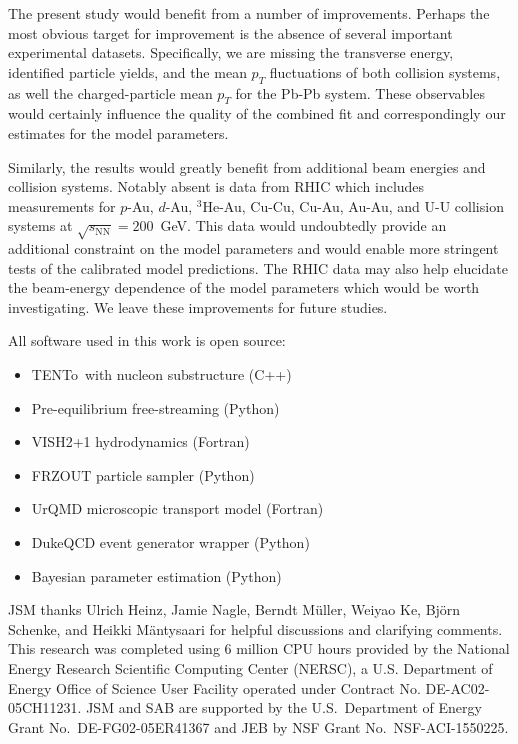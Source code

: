 \documentclass[aps,prc,reprint,amsmath,nofootinbib]{revtex4-1}
\newcommand{\trento}{T\raisebox{-0.5ex}{R}ENTo}
\newcommand{\sqrts}{\sqrt{s_\mathrm{NN}}}
\begin{document}
The present study would benefit from a number of improvements.
Perhaps the most obvious target for improvement is the absence of several important experimental datasets.
Specifically, we are missing the transverse energy, identified particle yields, and the mean $p_T$ fluctuations of both collision systems, as well the charged-particle mean $p_T$ for the Pb-Pb system.
These observables would certainly influence the quality of the combined fit and correspondingly our estimates for the model parameters.

Similarly, the results would greatly benefit from additional beam energies and collision systems.
Notably absent is data from RHIC which includes measurements for $p$-Au, $d$-Au, $^3$He-Au, Cu-Cu, Cu-Au, Au-Au, and \mbox{U-U} collision systems at $\sqrts=200$~GeV.
This data would undoubtedly provide an additional constraint on the model parameters and would enable more stringent tests of the calibrated model predictions.
The RHIC data may also help elucidate the beam-energy dependence of the model parameters which would be worth investigating.
We leave these improvements for future studies.

\medskip

All software used in this work is open source:
\begin{itemize}[leftmargin=2\parindent, itemsep=0pt, topsep=5pt]
  \item \trento\ with nucleon substructure (C++) \cite{trento:code}
  \item Pre-equilibrium free-streaming (Python) \cite{freestream:code}
  \item VISH2+1 hydrodynamics (Fortran) \cite{osuhydro:code}
  \item FRZOUT particle sampler (Python) \cite{frzout:code}
  \item UrQMD microscopic transport model (Fortran) \cite{urqmd:code}
  \item DukeQCD event generator wrapper (Python) \cite{eventgen:code}
  \item Bayesian parameter estimation (Python) \cite{bayesian:code}
\end{itemize}

\medskip

\begin{acknowledgments}
  JSM thanks Ulrich Heinz, Jamie Nagle, Berndt M\"uller, Weiyao Ke, Bj\"orn Schenke, and Heikki M\"antysaari for helpful discussions and clarifying comments.
  This research was completed using 6 million CPU hours provided by the National Energy Research Scientific Computing Center (NERSC), a U.S. Department of Energy Office of Science User Facility operated under Contract No. DE-AC02-05CH11231.
  JSM and SAB are supported by the U.S.\ Department of Energy Grant No.\ DE-FG02-05ER41367 and JEB by NSF Grant No.\ NSF-ACI-1550225.
\end{acknowledgments}
\end{document}

